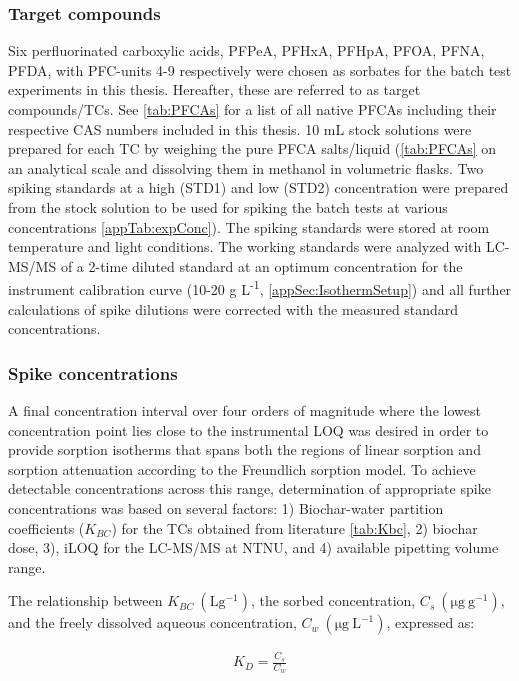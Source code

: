 \subsubsection{Target compounds}\label{sec:PFCAanalytic}
Six perfluorinated carboxylic acids, PFPeA, PFHxA, PFHpA, PFOA, PFNA, PFDA, with PFC-units 4-9 respectively were chosen as sorbates for the batch test experiments in this thesis. Hereafter, these are referred to as target compounds/TCs. See \cref{tab:PFCAs} for a list of all native PFCAs including their respective CAS numbers included in this thesis. 10 mL stock solutions were prepared for each TC by weighing the pure PFCA salts/liquid (\cref{tab:PFCAs} on an analytical scale and dissolving them in methanol in volumetric flasks. Two spiking standards at a high (STD1) and low (STD2) concentration were prepared from the stock solution to be used for spiking the batch tests at various concentrations \cref{appTab:expConc}). The spiking standards were stored at room temperature and light conditions. The working standards were analyzed with LC-MS/MS of a 2-time diluted standard at an optimum concentration for the instrument calibration curve (10-20 \textmu g L\textsuperscript{-1}, \cref{appSec:IsothermSetup}) and all further calculations of spike dilutions were corrected with the measured standard concentrations.

\subsubsection{Spike concentrations}
A final concentration interval over four orders of magnitude where the lowest concentration point lies close to the instrumental LOQ was desired in order to provide sorption isotherms that spans both the regions of linear sorption and sorption attenuation according to the Freundlich sorption model. To achieve detectable concentrations across this range, determination of appropriate spike concentrations was based on several factors: 1) Biochar-water partition coefficients ($K_{BC}$) for the TCs obtained from literature \cite{Xiao2017} \cref{tab:Kbc}, 2) biochar dose, 3), iLOQ for the LC-MS/MS at NTNU, and 4) available pipetting volume range. 


The relationship between $K_{BC}~\mathrm{(L g^{-1})}$, the sorbed concentration, $C_s~\mathrm{(\mu g~g^{-1})}$, and the freely dissolved aqueous concentration, $C_w~\mathrm{(\mu g~L^{-1})}$, expressed as:

\begin{align}
    \label{eq:Kbc1}
    K_{D} = \frac{C_s}{C_w}
\end{align}


